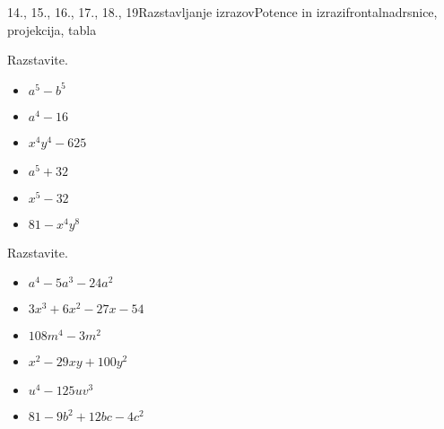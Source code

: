 \begin{priprava}{14., 15., 16., 17., 18., 19}{}{Razstavljanje izrazov}{Potence in izrazi}{frontalna}{drsnice, projekcija, tabla}
\begin{multicols}{2}
            \begin{naloga}
                Razstavite.
                \begin{itemize}
                    \item $a^5-b^5$ 
                    \item $a^4-16$ 
                    \item $x^4y^4-625$ 
                    \item $a^5+32$ 
                    \item $x^5-32$ 
                    \item $81-x^4y^8$ 
                \end{itemize}
            \end{naloga}
        
    
        
            \begin{naloga}
                Razstavite.
                \begin{itemize}
                    \item $a^4-5a^3-24a^2$ 
                    \item $3x^3+6x^2-27x-54$ 
                    \item $108m^4-3m^2$ 
                    \item $x^2-29xy+100y^2$ 
                    \item $u^4-125uv^3$ 
                    \item $81-9b^2+12bc-4c^2$ 
                \end{itemize}
            \end{naloga}
        
            ~
        \end{multicols}
    

\end{priprava}